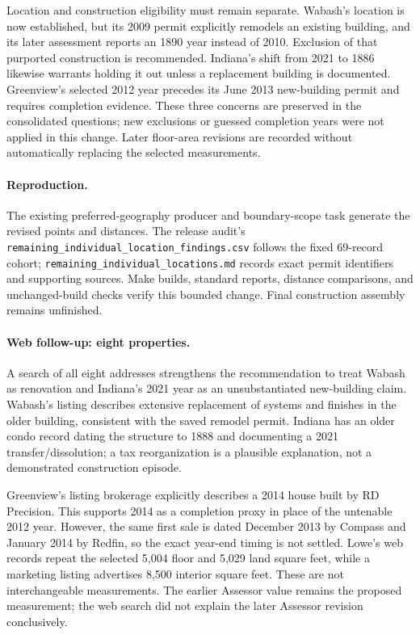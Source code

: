 Location and construction eligibility must remain separate. Wabash's location is now established, but its 2009 permit explicitly remodels an existing building, and its later assessment reports an 1890 year instead of 2010. Exclusion of that purported construction is recommended. Indiana's shift from 2021 to 1886 likewise warrants holding it out unless a replacement building is documented. Greenview's selected 2012 year precedes its June 2013 new-building permit and requires completion evidence. These three concerns are preserved in the consolidated questions; new exclusions or guessed completion years were not applied in this change. Later floor-area revisions are recorded without automatically replacing the selected measurements.

\paragraph{Reproduction.} The existing preferred-geography producer and boundary-scope task generate the revised points and distances. The release audit's \texttt{remaining\_individual\_location\_findings.csv} follows the fixed 69-record cohort; \texttt{remaining\_individual\_locations.md} records exact permit identifiers and supporting sources. Make builds, standard reports, distance comparisons, and unchanged-build checks verify this bounded change. Final construction assembly remains unfinished.

\clearpage
\paragraph{Web follow-up: eight properties.}
A search of all eight addresses strengthens the recommendation to treat Wabash as renovation and Indiana's 2021 year as an unsubstantiated new-building claim. Wabash's listing describes extensive replacement of systems and finishes in the older building, consistent with the saved remodel permit. Indiana has an older condo record dating the structure to 1888 and documenting a 2021 transfer/dissolution; a tax reorganization is a plausible explanation, not a demonstrated construction episode.

Greenview's listing brokerage explicitly describes a 2014 house built by RD Precision. This supports 2014 as a completion proxy in place of the untenable 2012 year. However, the same first sale is dated December 2013 by Compass and January 2014 by Redfin, so the exact year-end timing is not settled. Lowe's web records repeat the selected 5,004 floor and 5,029 land square feet, while a marketing listing advertises 8,500 interior square feet. These are not interchangeable measurements. The earlier Assessor value remains the proposed measurement; the web search did not explain the later Assessor revision conclusively.

